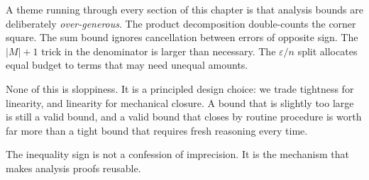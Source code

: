 \begin{remark*}
A theme running through every section of this chapter is that analysis
bounds are deliberately \emph{over-generous}.
The product decomposition double-counts the corner square.
The sum bound ignores cancellation between errors of opposite sign.
The $|M| + 1$ trick in the denominator is larger than necessary.
The $\varepsilon/n$ split allocates equal budget to terms that may need
unequal amounts.

None of this is sloppiness.
It is a principled design choice: we trade tightness for linearity,
and linearity for mechanical closure.
A bound that is slightly too large is still a valid bound, and a valid
bound that closes by routine procedure is worth far more than a tight
bound that requires fresh reasoning every time.

The inequality sign is not a confession of imprecision.
It is the mechanism that makes analysis proofs reusable.
\end{remark*}